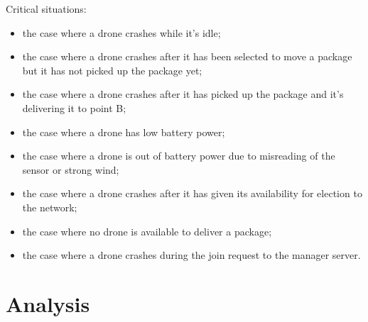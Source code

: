 \documentclass[a4paper, oneside]{memoir}
\begin{document}
Critical situations:
\begin{itemize}
	\item the case where a drone crashes while it's idle;
	\item the case where a drone crashes after it has been selected to move a package but it has not picked up the package yet;
	\item the case where a drone crashes after it has picked up the package and it's delivering it to point B;
	\item the case where a drone has low battery power;
	\item the case where a drone is out of battery power due to misreading of the sensor or strong wind;
	\item the case where a drone crashes after it has given its availability for election to the network;
	\item the case where no drone is available to deliver a package;
	\item the case where a drone crashes during the join request to the manager server.
\end{itemize}



\chapter{Analysis}\label{ch:analysis}

\end{document}
